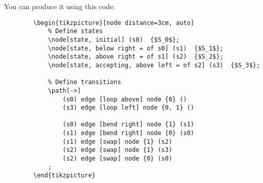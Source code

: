 \documentclass[10pt,a4paper,english]{article}
\begin{document}
    You can produce it using this code:
    \begin{verbatim}
        \begin{tikzpicture}[node distance=3cm, auto]
            % Define states
            \node[state, initial] (s0)  {$S_0$};
            \node[state, below right = of s0] (s1)  {$S_1$};
            \node[state, above right = of s1] (s2)  {$S_2$};
            \node[state, accepting, above left = of s2] (s3)  {$S_3$};
            
            % Define transitions
            \path[->]
                (s0) edge [loop above] node {0} ()
                (s3) edge [loop left] node {0, 1} ()
                
                (s0) edge [bend right] node {1} (s1)
                (s1) edge [bend right] node {0} (s0)
                (s1) edge [swap] node {1} (s2)
                (s2) edge [swap] node {1} (s3)
                (s2) edge [swap] node {0} (s0)
            ;
        \end{tikzpicture}
    \end{verbatim}
\end{document}
